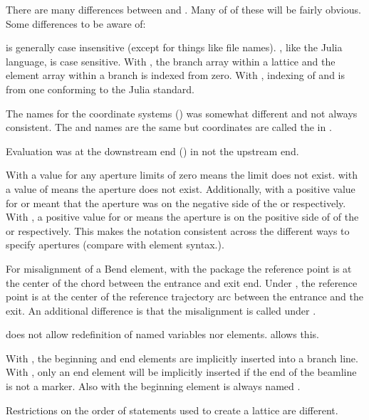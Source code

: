 There are many differences between \accellat and \bmad. Many of of these will be fairly
obvious. 
Some differences to be aware of:
\begin{description}
\item
\bmad is generally case insensitive (except for things like file names). \accellat, like
the Julia language, is case sensitive.
%
With \bmad, the branch array within a lattice and the element array within a branch is
indexed from zero. With \scibmad, indexing of  and  is 
from one conforming to the Julia standard.
%
\item
The \bmad names for the coordinate systems () was somewhat different and not
always consistent. The  and  names are the same but 
coordinates are called the  in \bmad.
%
\item
Evaluation was at the downstream end () in \bmad not the upstream end.
%
\item
With \bmad a value for any aperture limits of zero means the limit does not exist.
with \accellat a value of  means the aperture does not exist. Additionally, with
\bmad a positive value for  or  meant that the aperture was
on the negative side of the  or  respectively. With \accellat, a positive
value for  or  means the aperture is on the positive side of 
of the  or  respectively. This makes the notation consistent across 
the different ways to specify apertures (compare with  element syntax.).
%
\item
For misalignment of a Bend element, with the \accellat package the reference point is at the center 
of the chord between the entrance and exit end. 
Under \bmad, the reference point is at the center of the reference trajectory arc between the entrance
and the exit. An additional difference is that the \bmad {} misalignment is called 
under \accellat.
%
\item
\bmad does not allow redefinition of named variables nor elements. \accellat allows this.
%
\item
With \bmad, the beginning and end elements are implicitly inserted into a branch line.
With \accellat, only an end element will be implicitly inserted if the end of the beamline is
not a marker. 
Also with \bmad the beginning element is always named . 
%
\item
Restrictions on the order of statements used to create a lattice are different. 

\end{description}
